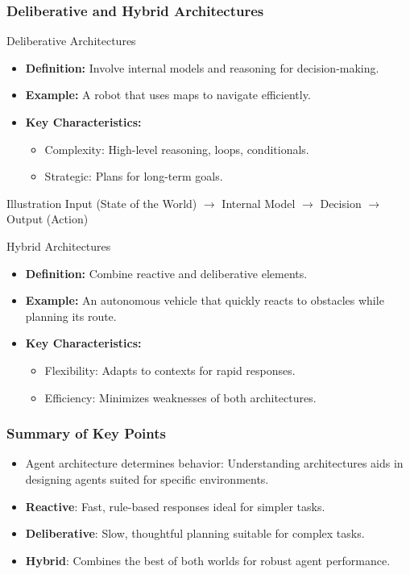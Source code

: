\documentclass[aspectratio=169]{beamer}
\begin{document}
\begin{frame}[fragile]
    \frametitle{Deliberative and Hybrid Architectures}
    \begin{block}{Deliberative Architectures}
        \begin{itemize}
            \item \textbf{Definition:} Involve internal models and reasoning for decision-making.
            \item \textbf{Example:} A robot that uses maps to navigate efficiently.
            \item \textbf{Key Characteristics:}
            \begin{itemize}
                \item Complexity: High-level reasoning, loops, conditionals.
                \item Strategic: Plans for long-term goals.
            \end{itemize}
        \end{itemize}
        \begin{block}{Illustration}
            Input (State of the World) $\rightarrow$ Internal Model $\rightarrow$ Decision $\rightarrow$ Output (Action)
        \end{block}
    \end{block}
    
    \begin{block}{Hybrid Architectures}
        \begin{itemize}
            \item \textbf{Definition:} Combine reactive and deliberative elements.
            \item \textbf{Example:} An autonomous vehicle that quickly reacts to obstacles while planning its route.
            \item \textbf{Key Characteristics:}
            \begin{itemize}
                \item Flexibility: Adapts to contexts for rapid responses.
                \item Efficiency: Minimizes weaknesses of both architectures.
            \end{itemize}
        \end{itemize}
    \end{block}
\end{frame}

\begin{frame}[fragile]
    \frametitle{Summary of Key Points}
    \begin{itemize}
        \item Agent architecture determines behavior: 
        Understanding architectures aids in designing agents suited for specific environments.
        \item \textbf{Reactive}: Fast, rule-based responses ideal for simpler tasks.
        \item \textbf{Deliberative}: Slow, thoughtful planning suitable for complex tasks.
        \item \textbf{Hybrid}: Combines the best of both worlds for robust agent performance.
    \end{itemize}
\end{frame}
\end{document}
